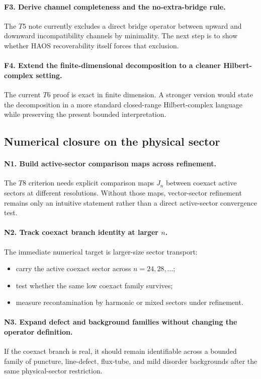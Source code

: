 \documentclass[11pt]{article}
\begin{document}
\paragraph{F3. Derive channel completeness and the no-extra-bridge rule.}
The $T5$ note currently excludes a direct bridge operator between upward and downward incompatibility channels by minimality. The next step is to show whether HAOS recoverability itself forces that exclusion.

\paragraph{F4. Extend the finite-dimensional decomposition to a cleaner Hilbert-complex setting.}
The current $T6$ proof is exact in finite dimension. A stronger version would state the decomposition in a more standard closed-range Hilbert-complex language while preserving the present bounded interpretation.

\subsection{Numerical closure on the physical sector}

\paragraph{N1. Build active-sector comparison maps across refinement.}
The $T8$ criterion needs explicit comparison maps $J_n$ between coexact active sectors at different resolutions. Without those maps, vector-sector refinement remains only an intuitive statement rather than a direct active-sector convergence test.

\paragraph{N2. Track coexact branch identity at larger $n$.}
The immediate numerical target is larger-size sector transport:
\begin{itemize}
\item carry the active coexact sector across $n=24,28,\dots$;
\item test whether the same low coexact family survives;
\item measure recontamination by harmonic or mixed sectors under refinement.
\end{itemize}

\paragraph{N3. Expand defect and background families without changing the operator definition.}
If the coexact branch is real, it should remain identifiable across a bounded family of puncture, line-defect, flux-tube, and mild disorder backgrounds after the same physical-sector restriction.
\end{document}
